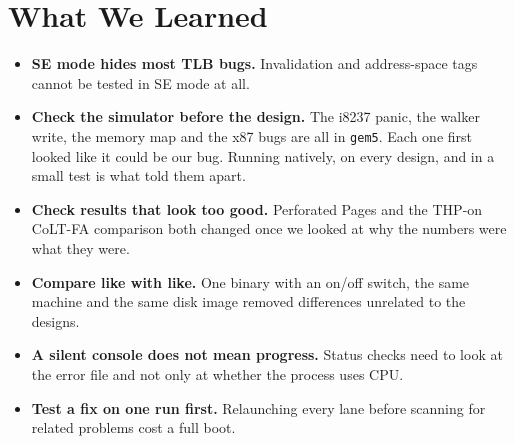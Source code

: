 \section{What We Learned}
\label{sec:chr_lessons}

\begin{itemize}
    \item \textbf{SE mode hides most TLB bugs.} Invalidation and address-space tags cannot be tested in SE mode at all.
    \item \textbf{Check the simulator before the design.} The i8237 panic, the walker write, the memory map and the x87 bugs are all in \texttt{gem5}. Each one first looked like it could be our bug. Running natively, on every design, and in a small test is what told them apart.
    \item \textbf{Check results that look too good.} Perforated Pages and the THP-on CoLT-FA comparison both changed once we looked at why the numbers were what they were.
    \item \textbf{Compare like with like.} One binary with an on/off switch, the same machine and the same disk image removed differences unrelated to the designs.
    \item \textbf{A silent console does not mean progress.} Status checks need to look at the error file and not only at whether the process uses CPU.
    \item \textbf{Test a fix on one run first.} Relaunching every lane before scanning for related problems cost a full boot.
\end{itemize}
